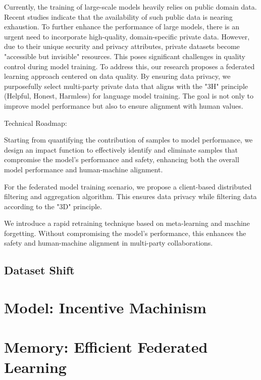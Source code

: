 \documentclass[withindex,glossary,firstyr]{cam-thesis}
\begin{document}
Currently, the training of large-scale models heavily relies on public domain data. Recent studies indicate that the availability of such public data is nearing exhaustion. To further enhance the performance of large models, there is an urgent need to incorporate high-quality, domain-specific private data. However, due to their unique security and privacy attributes, private datasets become "accessible but invisible" resources. This poses significant challenges in quality control during model training. To address this, our research proposes a federated learning approach centered on data quality. By ensuring data privacy, we purposefully select multi-party private data that aligns with the "3H" principle (Helpful, Honest, Harmless) for language model training. The goal is not only to improve model performance but also to ensure alignment with human values.

Technical Roadmap:

Starting from quantifying the contribution of samples to model performance, we design an impact function to effectively identify and eliminate samples that compromise the model's performance and safety, enhancing both the overall model performance and human-machine alignment.

For the federated model training scenario, we propose a client-based distributed filtering and aggregation algorithm. This ensures data privacy while filtering data according to the "3D" principle.

We introduce a rapid retraining technique based on meta-learning and machine forgetting. Without compromising the model's performance, this enhances the safety and human-machine alignment in multi-party collaborations.


\subsection{Dataset Shift} 


\section{Model: Incentive Machinism}

\section{Memory: Efficient Federated Learning}
\end{document}

